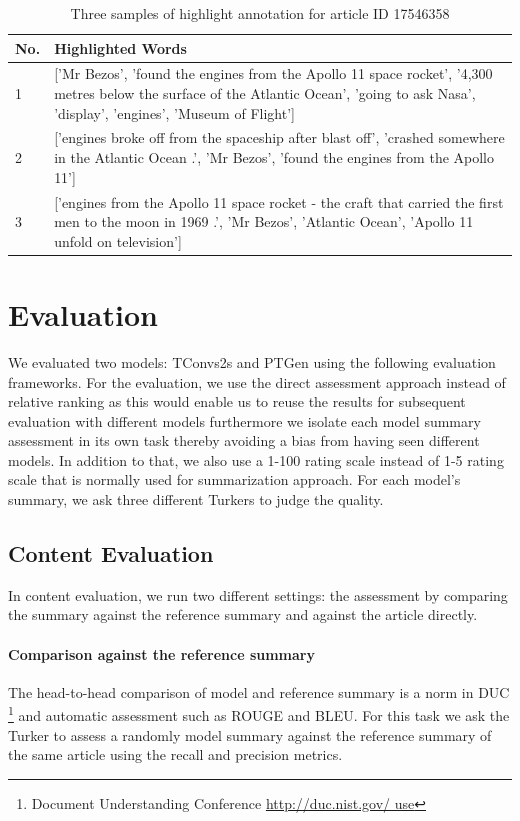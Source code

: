 \documentclass[11pt,a4paper]{article}
\begin{document}
\begin{table}[!h]
  \small
  \begin{tabular}{lp{6.5cm}}
  No. & Highlighted Words \\
  \hline
  1 & {[}'Mr Bezos', 'found the engines from the Apollo 11 space rocket', '4,300 metres below the surface of the Atlantic Ocean', 'going to ask Nasa', 'display', 'engines', 'Museum of Flight'{]} \\
  2 & {[}'engines broke off from the spaceship after blast off', 'crashed somewhere in the Atlantic Ocean .', 'Mr Bezos', 'found the engines from the Apollo 11'{]}                                          \\
  3 & {['engines from the Apollo 11 space rocket - the craft that carried the first men to the moon in 1969 .', 'Mr Bezos', 'Atlantic Ocean', 'Apollo 11 unfold on television']} \\
  \end{tabular}
\caption{Three samples of highlight annotation for article ID 17546358 }
\label{table:highlightedwords}
\end{table}
   

\section{Evaluation}
We evaluated two models: TConvs2s \citep{Shashi2018} and PTGen \citep{See2017} using the following evaluation frameworks. For the evaluation, we use the direct assessment approach instead of relative ranking as this would enable us to reuse the results for subsequent evaluation with different models furthermore we isolate each model summary assessment in its own task thereby avoiding a bias from having seen different models. In addition to that, we also use a 1-100 rating scale instead of 1-5 rating scale that is normally used for summarization approach. For each model's summary, we ask three different Turkers to judge the quality.

\subsection{Content Evaluation}
In content evaluation, we run two different settings: the assessment by comparing the summary against the reference summary and against the article directly. 

\paragraph{Comparison against the reference summary} The head-to-head comparison of model and reference summary is a norm in DUC \footnote{Document Understanding Conference \url{http://duc.nist.gov/
use}} and automatic assessment such as ROUGE and BLEU. For this task we ask the Turker to assess a randomly model summary against the reference summary of the same article using the recall and precision metrics.
\end{document}
